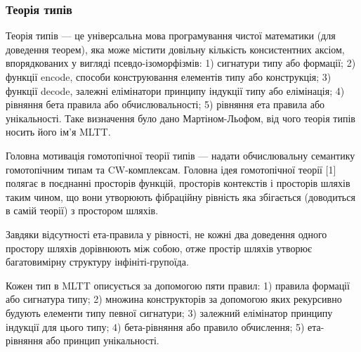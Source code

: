 \subsubsection{Теорія типів}
Теорія типів --- це універсальна мова програмування чистої
математики (для доведення теорем), яка може містити довільну
кількість консистентних аксіом, впорядкованих у вигляді псевдо-ізоморфізмів:
1) сигнатури типу або формації;
2) функції encode, способи конструювання елементів типу або конструкція;
3) функції decode, залежні елімінатори принципу індукції типу або елімінація;
4) рівняння бета правила або обчислювальності;
5) рівняння ета правила або унікальності.
Таке визначення було дано Мартіном-Льофом,
від чого теорія типів носить його ім'я MLTT.

Головна мотивація гомотопічної теорії типів — надати обчислювальну
семантику гомотопічним типам та CW-комплексам. Головна ідея
гомотопічної теорії [1] полягає в поєднанні просторів функцій,
просторів контекстів  і просторів шляхів  таким чином, що вони
утворюють фібраційну рівність яка збігається (доводиться в самій
теорії) з простором шляхів.

Завдяки відсутності ета-правила у рівності, не кожні два
доведення одного простору шляхів дорівнюють між собою, отже
простір шляхів утворює багатовимірну структуру інфініті-групоїда.

Кожен тип в MLTT описується за допомогою пяти правил:
1) правила формації або сигнатура типу;
2) множина конструкторів за допомогою яких рекурсивно будують елементи типу певної сигнатури;
3) залежний елімінатор принципу індукції для цього типу;
4) бета-рівняння або правило обчислення;
5) ета-рівняння або принцип унікальності.

